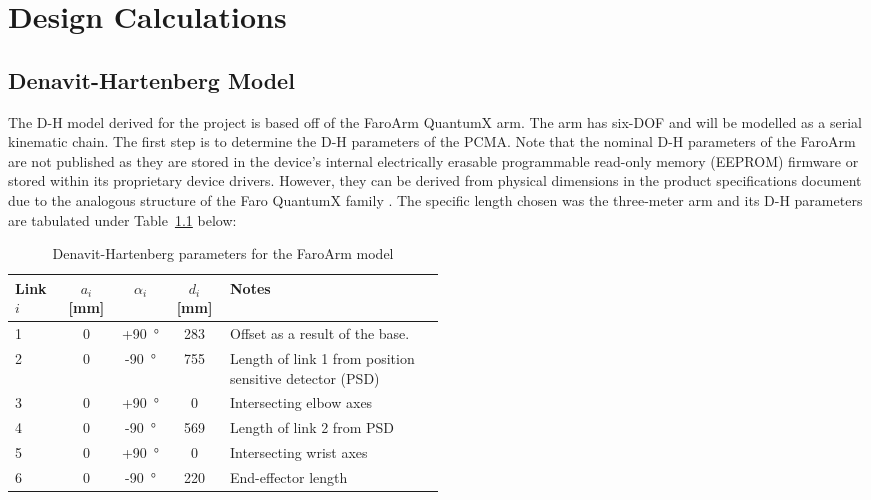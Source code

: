 \chapter{Design Calculations}

\section{Denavit-Hartenberg Model}
The D-H model derived for the project is based off of the FaroArm QuantumX arm. The arm has six-DOF and will be modelled as a serial kinematic chain. The first step is to determine the D-H parameters of the PCMA. Note that the nominal D-H parameters of the FaroArm are not published as they are stored in the device's internal electrically erasable programmable read-only memory (EEPROM) firmware or stored within its proprietary device drivers. However, they can be derived from physical dimensions in the product specifications document due to the analogous structure of the Faro QuantumX family \cite{Faro:2024}. The specific length chosen was the three-meter arm and its D-H parameters are tabulated under Table~\ref{tab:DH} below:

\begin{table}[H]
	\centering
	\caption{Denavit-Hartenberg parameters for the FaroArm model}
	\label{tab:DH}
	\begin{tabular}{lccc p{0.5\linewidth}}
		\hline
		Link $i$ & $a_i$ [mm] & $\alpha_i$ & $d_i$ [mm] & Notes \\ \hline
		1 & 0 & +\SI{90}{\degree} & 283 & Offset as a result of the base. \\ 
		2 & 0 & -\SI{90}{\degree} & 755 & Length of link 1 from position sensitive detector (PSD) \\ 
		3 & 0 & +\SI{90}{\degree} & 0 & Intersecting elbow axes\footnotemark[1] \\
		4 & 0 & -\SI{90}{\degree} & 569 & Length of link 2 from PSD \\
		5 & 0 & +\SI{90}{\degree} & 0 & Intersecting wrist axes\footnotemark[2] \\
		6 & 0 & -\SI{90}{\degree} & 220 & End-effector length \\
		\hline
	\end{tabular}
\end{table}

